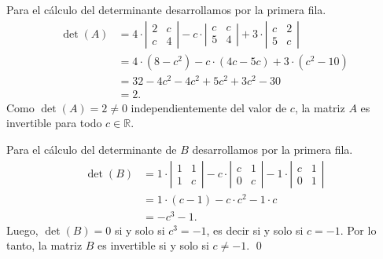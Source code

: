 \begin{enumerate}[topsep=6pt,itemsep=.4cm]
    Para el cálculo del determinante desarrollamos por la primera fila.
    \begin{align*}
        \det(A) &= 4\cdot \left|\begin{matrix} 2&c\\ c&4\end{matrix}\right| - c\cdot \left|\begin{matrix} c&c\\ 5&4\end{matrix}\right| + 3\cdot \left|\begin{matrix} c&2\\ 5&c\end{matrix}\right|\\
        &= 4\cdot (8 - c^2) - c\cdot (4c - 5c) + 3\cdot (c^2 - 10)\\
        &= 32 - 4c^2 - 4c^2 + 5c^2 + 3c^2 - 30\\
        &=  2.    
    \end{align*}
    Como $\det(A) = 2 \ne 0$ independientemente del valor de $c$, la matriz $A$ es invertible para todo $c\in\mathbb{R}$.

    Para el cálculo del determinante de $B$ desarrollamos por la primera fila.
    \begin{align*}
        \det(B) &= 1\cdot \left|\begin{matrix} 1&1\\ 1&c\end{matrix}\right| - c\cdot \left|\begin{matrix} c&1\\ 0&c\end{matrix}\right| - 1\cdot \left|\begin{matrix} c&1\\ 0&1\end{matrix}\right|\\
        &= 1\cdot (c - 1) - c\cdot c^2 - 1\cdot c\\
        &= -c^3 -  1.
    \end{align*}
    Luego, $\det(B) = 0$ si y solo si $c^3 = -1$, es decir si y solo si $c = -1$. Por lo tanto, la matriz $B$ es invertible si y solo si $c\ne -1$.
    \qed



\end{enumerate}
